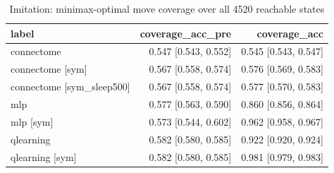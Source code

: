 \begin{table}[t]
\centering
\small
\begin{tabular}{lrr}
\toprule
label & coverage\_acc\_pre & coverage\_acc \\
\midrule
connectome & 0.547 [0.543, 0.552] & 0.545 [0.543, 0.547] \\
connectome [sym] & 0.567 [0.558, 0.574] & 0.576 [0.569, 0.583] \\
connectome [sym\_sleep500] & 0.567 [0.558, 0.574] & 0.577 [0.570, 0.583] \\
mlp & 0.577 [0.563, 0.590] & 0.860 [0.856, 0.864] \\
mlp [sym] & 0.573 [0.544, 0.602] & 0.962 [0.958, 0.967] \\
qlearning & 0.582 [0.580, 0.585] & 0.922 [0.920, 0.924] \\
qlearning [sym] & 0.582 [0.580, 0.585] & 0.981 [0.979, 0.983] \\
\bottomrule
\end{tabular}
\caption{Imitation: minimax-optimal move coverage over all 4520 reachable states}
\label{tab:tictactoe_imitation}
\end{table}
